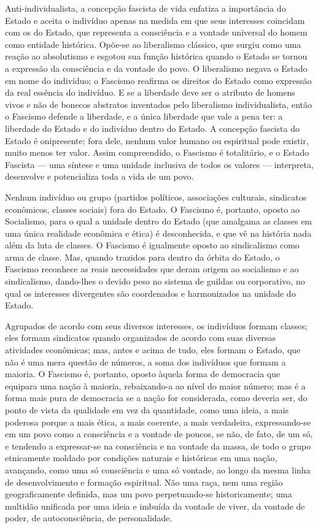 \documentclass[12pt]{article}
\begin{document}
Anti-individualista, a concepção fascista de vida enfatiza a importância do Estado e aceita o indivíduo apenas na medida em que seus interesses coincidam com os do Estado, que representa a consciência e a vontade universal do homem como entidade histórica. Opõe-se ao liberalismo clássico, que surgiu como uma reação ao absolutismo e esgotou sua função histórica quando o Estado se tornou a expressão da consciência e da vontade do povo. O liberalismo negava o Estado em nome do indivíduo; o Fascismo reafirma os direitos do Estado como expressão da real essência do indivíduo. E se a liberdade deve ser o atributo de homens vivos e não de bonecos abstratos inventados pelo liberalismo individualista, então o Fascismo defende a liberdade, e a única liberdade que vale a pena ter: a liberdade do Estado e do indivíduo dentro do Estado. A concepção fascista do Estado é onipresente; fora dele, nenhum valor humano ou espiritual pode existir, muito menos ter valor. Assim compreendido, o Fascismo é totalitário, e o Estado Fascista — uma síntese e uma unidade inclusiva de todos os valores — interpreta, desenvolve e potencializa toda a vida de um povo.

Nenhum indivíduo ou grupo (partidos políticos, associações culturais, sindicatos econômicos, classes sociais) fora do Estado. O Fascismo é, portanto, oposto ao Socialismo, para o qual a unidade dentro do Estado (que amalgama as classes em uma única realidade econômica e ética) é desconhecida, e que vê na história nada além da luta de classes. O Fascismo é igualmente oposto ao sindicalismo como arma de classe. Mas, quando trazidos para dentro da órbita do Estado, o Fascismo reconhece as reais necessidades que deram origem ao socialismo e ao sindicalismo, dando-lhes o devido peso no sistema de guildas ou corporativo, no qual os interesses divergentes são coordenados e harmonizados na unidade do Estado.

Agrupados de acordo com seus diversos interesses, os indivíduos formam classes; eles formam sindicatos quando organizados de acordo com suas diversas atividades econômicas; mas, antes e acima de tudo, eles formam o Estado, que não é uma mera questão de números, a soma dos indivíduos que formam a maioria. O Fascismo é, portanto, oposto àquela forma de democracia que equipara uma nação à maioria, rebaixando-a ao nível do maior número; mas é a forma mais pura de democracia se a nação for considerada, como deveria ser, do ponto de vista da qualidade em vez da quantidade, como uma ideia, a mais poderosa porque a mais ética, a mais coerente, a mais verdadeira, expressando-se em um povo como a consciência e a vontade de poucos, se não, de fato, de um só, e tendendo a expressar-se na consciência e na vontade da massa, de todo o grupo etnicamente moldado por condições naturais e históricas em uma nação, avançando, como uma só consciência e uma só vontade, ao longo da mesma linha de desenvolvimento e formação espiritual. Não uma raça, nem uma região geograficamente definida, mas um povo perpetuando-se historicamente; uma multidão unificada por uma ideia e imbuída da vontade de viver, da vontade de poder, de autoconsciência, de personalidade.
\end{document}

